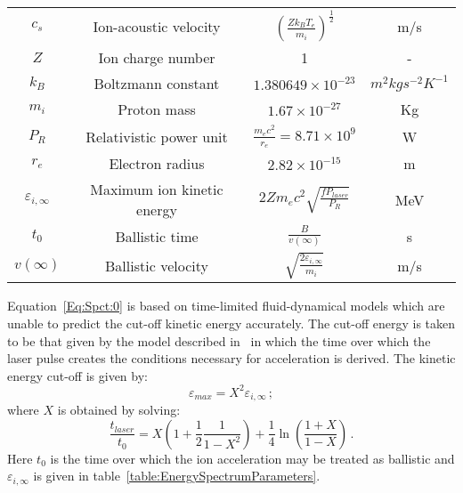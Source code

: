 \begin{table}
\begin{center}
\begin{tabular}{c c c c}
      $c_{s}$ & Ion-acoustic velocity & $(\frac{Z k_{B} T_{e}}{m_{i}})^{\frac{1}{2}}$ & m/s \\  
      $Z$ & Ion charge number & 1 & - \\  
      $k_{B}$ & Boltzmann constant & $1.380649 \times 10^{-23}$ & $m^{2} kg s^{-2} K^{-1}$ \\  
      $m_{i}$ & Proton mass & $1.67 \times 10^{-27}$ & Kg \\ 
      $P_{R}$ & Relativistic power unit & $\frac{m_{e} c^{2}}{r_{e}} = 8.71 \times 10^{9}$ & W \\  
      $r_{e}$ & Electron radius & $2.82 \times 10^{-15}$ & m \\  
      $\varepsilon_{i,\infty}$ & Maximum ion kinetic energy & $2 Z m_{e} c^{2} \sqrt{\frac{f P_{laser}}{P_{R}}}$ & MeV \\  
      $t_{0}$ & Ballistic time & $\frac{B}{v(\infty)}$ & s \\  
      $v(\infty)$ & Ballistic velocity & $\sqrt{\frac{2 \varepsilon_{i,\infty}}{m_{i}}}$ & m/s \\  
      \hline
    \end{tabular}
  \end{center}
\end{table}

Equation~\ref{Eq:Spct:0} is based on time-limited fluid-dynamical
models which are unable to predict the cut-off kinetic energy
accurately. 
The cut-off energy is taken to be that given by the model described
in~\cite{10.1103/PhysRevLett.97.045005} in which the time over which
the laser pulse creates the conditions necessary for acceleration is
derived.
The kinetic energy cut-off is given by:
\begin{equation}
  \varepsilon_{max} = X^{2} \varepsilon_{i,\infty} \, ;
  \label{eq:Eq:Spct:2}
\end{equation}
where $X$ is obtained by solving:
\begin{equation}
  \frac{t_{laser}}{t_{0}} = X \left( 1 + \frac{1}{2}
                           \frac{1}{1 - X^{2}} \right) +
                           \frac{1}{4} \ln \left( \frac{1+X}{1-X} \right) \, .
  \label{eq:Eq:Spct:1}
\end{equation}
Here $t_0$ is the time over which the ion acceleration may be treated
as ballistic and $\varepsilon_{i,\infty}$ is given in
table~\ref{table:EnergySpectrumParameters}.

